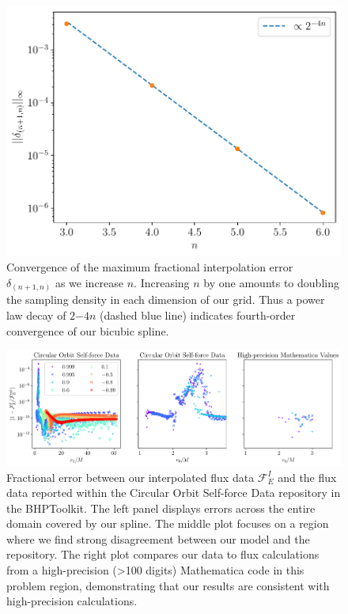 \documentclass[%
 reprint,
 nofootinbib,
 amsmath,amssymb,
 aps,
 prd,
]{revtex4-2}
\begin{document}
\begin{figure}[bhtp]
    \centering
    \includegraphics[width=0.95\linewidth]{figures/spline_convergence.pdf}
    \caption{Convergence of the maximum fractional interpolation error $\delta_{(n+1,n)}$ as we increase $n$. Increasing $n$ by one amounts to  doubling the sampling density in each dimension of our grid. Thus a power law decay of $2{-4n}$ (dashed blue line) indicates fourth-order convergence of our bicubic spline.}
    \label{fig:fluxSplineConvergence}
\end{figure}

\begin{figure}[bhtp]
    \centering
    \includegraphics[width=0.95\linewidth]{figures/flux_comparison.pdf}
    \caption{Fractional error between our interpolated flux data $\mathcal{F}_E^I$ and the flux data reported within the Circular Orbit Self-force Data repository in the BHPToolkit. The left panel displays errors across the entire domain covered by our spline. The middle plot focuses on a region where we find strong disagreement between our model and the repository. The right plot compares our data to flux calculations from a high-precision (>100 digits) Mathematica code in this problem region, demonstrating that our results are consistent with high-precision calculations.}
    \label{fig:fluxComparison}
\end{figure}
\end{document}
